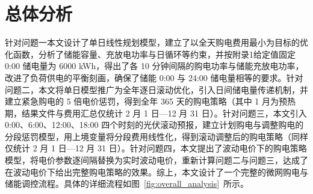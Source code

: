 
\section{总体分析}

针对问题一本文设计了单日线性规划模型，建立了以全天购电费用最小为目标的优化函数，分析了储能容量、充放电功率与日循环等约束，并按附录1给定值固定 0:00 储电量为 6000 kWh，得出了各 10 分钟间隔的购电功率与储能充放电功率，改进了负荷供电的平衡刻画，确保了储能 0:00 与 24:00 储电量相等的要求。针对问题二，本文将单日模型推广为全年逐日滚动优化，引入日间储电量传递机制，并建立紧急购电的 5 倍电价惩罚，得到全年 365 天的购电策略（其中 1 月为预热期，结果文件与费用汇总仅统计 2 月 1 日—12 月 31 日）。针对问题三，本文引入 0:00、6:00、12:00、18:00 四个时刻的光伏滚动预报，建立计划购电与调整购电的分段惩罚模型，用上境变量将分段费用线性化，得到滚动调整后的购电策略（同样仅统计 2 月 1 日—12 月 31 日）。针对问题四，本文提出了波动电价下的购电策略模型，将电价参数逐间隔替换为实时波动电价，重新计算问题二与问题三，达成了在波动电价下给出完整购电策略的效果。综上，本文设计了一个完整的微网购电与储能调控流程。具体的详细流程如图~\ref{fig:overall_analysis}~所示。

